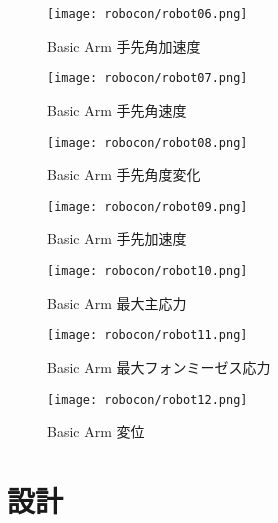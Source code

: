 \documentclass[10pt,b5paper,papersize,dvipdfmx]{jsbook}
\begin{document}
\begin{figure}[htbp]
  \centering
  \texttt{[image: robocon/robot06.png]}
  \caption{Basic Arm 手先角加速度}
  \label{Basic Arm 手先角加速度}
\end{figure}
\begin{figure}[htbp]
  \centering
  \texttt{[image: robocon/robot07.png]}
  \caption{Basic Arm 手先角速度}
  \label{fig:Basic Arm 手先角速度}
\end{figure}
\begin{figure}[htbp]
  \centering
  \texttt{[image: robocon/robot08.png]}
  \caption{Basic Arm 手先角度変化}
  \label{fig:Basic Arm 手先角度変化2}
\end{figure}
\begin{figure}[htbp]
  \centering
  \texttt{[image: robocon/robot09.png]}
  \caption{Basic Arm 手先加速度}
  \label{fig:Basic Arm 手先加速度}
\end{figure}
\begin{figure}[htbp]
  \centering
  \texttt{[image: robocon/robot10.png]}
  \caption{Basic Arm 最大主応力}
  \label{fig:Basic Arm 最大主応力}
\end{figure}
\begin{figure}[htbp]
  \centering
  \texttt{[image: robocon/robot11.png]}
  \caption{Basic Arm 最大フォンミーゼス応力}
  \label{fig:Basic Arm 最大フォンミーゼス応力}
\end{figure}
\begin{figure}[htbp]
  \centering
  \texttt{[image: robocon/robot12.png]}
  \caption{Basic Arm 変位}
  \label{fig:Basic Arm 変位}
\end{figure}
\clearpage
\section{設計}
\end{document}
